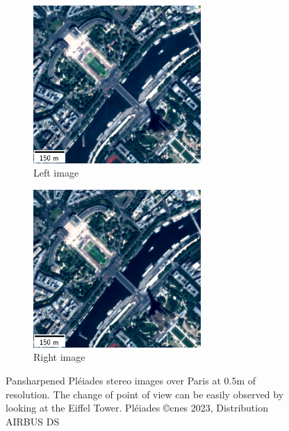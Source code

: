 \begin{figure}
    \centering
    \begin{subfigure}[t]{0.5\linewidth}
        \centering
        \includegraphics[height=6cm]{Images/Chap_1/Paris_Left_stereo.png}
        \caption{Left image}
        \label{fig:Pleiade_over_Paris_a}
    \end{subfigure}\hfill
    \begin{subfigure}[t]{0.5\linewidth}
        \centering
        \includegraphics[height=6cm]{Images/Chap_1/Paris_Right_stereo.png}
        \caption{Right image}
        \label{fig:Pleiade_over_Paris_b}
    \end{subfigure}
    \caption{Pansharpened Pléiades stereo images over Paris at $0.5$m of resolution. The change of point of view can be easily observed by looking at the Eiffel Tower. Pléiades \copyright \acrshort{cnes} 2023, Distribution AIRBUS DS}
    \label{fig:Pleiade_over_Paris}
\end{figure}

